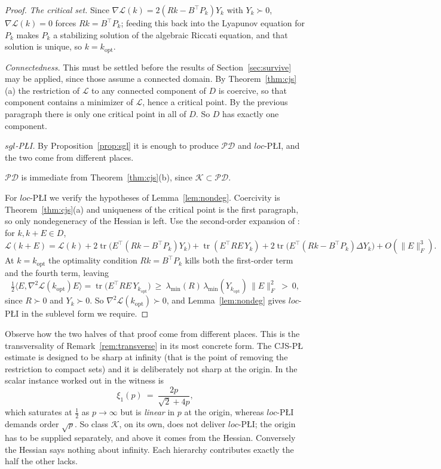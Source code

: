 \documentclass[11pt]{article}
\theoremstyle{plain}
\theoremstyle{definition}
\theoremstyle{remark}
\begin{document}
\begin{proof}
\emph{The critical set.} Since $\nabla\mathcal{L}(k) = 2(Rk-B^\top P_k)Y_k$ with
$Y_k\succ0$, $\nabla\mathcal{L}(k)=0$ forces $Rk = B^\top P_k$; feeding this back
into the Lyapunov equation for $P_k$ makes $P_k$ a stabilizing solution of the
algebraic Riccati equation, and that solution is unique, so
$k=k_{\mathrm{opt}}$.

\emph{Connectedness.} This must be settled before the results of
Section~\ref{sec:survive} may be applied, since those assume a connected domain.
By Theorem~\ref{thm:cjs}(a) the restriction of $\mathcal{L}$ to any connected
component of $D$ is coercive, so that component contains a minimizer of
$\mathcal{L}$, hence a critical point. By the previous paragraph there is only
one critical point in all of $D$. So $D$ has exactly one component.

\emph{$sgl$-P\L{}I.} By Proposition~\ref{prop:sgl} it is enough to produce
$\mathcal{PD}$ and $loc$-P\L{}I, and the two come from different places.

$\mathcal{PD}$ is immediate from Theorem~\ref{thm:cjs}(b), since
$\mathcal{K}\subset\mathcal{PD}$.

For $loc$-P\L{}I we verify the hypotheses of Lemma~\ref{lem:nondeg}. Coercivity
is Theorem~\ref{thm:cjs}(a) and uniqueness of the critical point is the first
paragraph, so only nondegeneracy of the Hessian is left. Use the second-order
expansion of \cite{CuiJiangSontag2024}: for
$k,k+E\in D$,
\[
  \mathcal{L}(k+E) = \mathcal{L}(k) + 2\operatorname{tr}\bigl(E^\top(Rk-B^\top P_k)Y_k\bigr)
  + \operatorname{tr}(E^\top R E\,Y_k)
  + 2\operatorname{tr}\bigl(E^\top(Rk-B^\top P_k)\Delta Y_k\bigr) + O(\|E\|_F^3) .
\]
At $k=k_{\mathrm{opt}}$ the optimality condition $Rk = B^\top P_k$ kills both the
first-order term and the fourth term, leaving
\[
  \tfrac12\bigl\langle E, \nabla^2\mathcal{L}(k_{\mathrm{opt}})E\bigr\rangle
  = \operatorname{tr}\bigl(E^\top R E\,Y_{k_{\mathrm{opt}}}\bigr)
  \ \ge\ \lambda_{\min}(R)\,\lambda_{\min}(Y_{k_{\mathrm{opt}}})\,\|E\|_F^2 \ >\ 0 ,
\]
since $R\succ0$ and $Y_k\succ0$. So $\nabla^2\mathcal{L}(k_{\mathrm{opt}})\succ0$,
and Lemma~\ref{lem:nondeg} gives $loc$-P\L{}I in the sublevel form we require.
\end{proof}

Observe how the two halves of that proof come from different places. This is
the transversality of Remark~\ref{rem:transverse} in its most concrete form. The
CJS-P\L{} estimate is designed to be sharp at infinity (that is the point of
removing the restriction to compact sets) and it is deliberately not sharp at
the origin. In the scalar instance worked out in \cite{CuiJiangSontag2024} the
witness is
\[
  \xi_1(p) \ =\ \frac{2p}{\sqrt2+4p} ,
\]
which saturates at $\tfrac12$ as $p\to\infty$ but is \emph{linear} in $p$ at the
origin, whereas $loc$-P\L{}I demands order $\sqrt p$. So class $\mathcal{K}$, on
its own, does not deliver $loc$-P\L{}I; the origin has to be supplied separately,
and above it comes from the Hessian. Conversely the Hessian says nothing about
infinity. Each hierarchy contributes exactly the half the other lacks.
\end{document}
